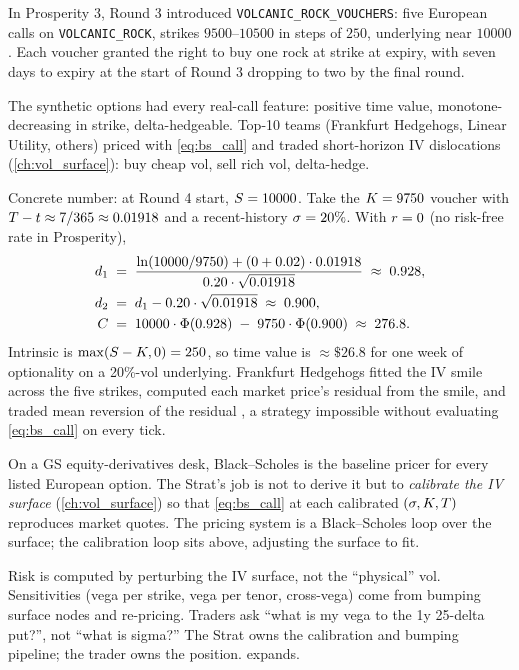 \begin{prosperitybox}
In Prosperity 3, Round 3 introduced
\texttt{VOLCANIC\_ROCK\_VOUCHERS}: five European calls on
\texttt{VOLCANIC\_ROCK}, strikes $9500$--$10500$ in steps of
$250$, underlying near $10000$ \citep{frankfurthedgehogs2025}.
Each voucher granted the right to buy one rock at strike at
expiry, with seven days to expiry at the start of Round 3
dropping to two by the final round.

The synthetic options had every real-call feature: positive time
value, monotone-decreasing in strike, delta-hedgeable. Top-10
teams (Frankfurt Hedgehogs, Linear Utility, others) priced with
\eqref{eq:bs_call} and traded short-horizon IV dislocations
(\cref{ch:vol_surface}): buy cheap vol, sell rich vol,
delta-hedge.

Concrete number: at Round 4 start, $S = 10000$. Take the
$K = 9750$ voucher with $T - t \approx 7/365 \approx
0.01918$ and a recent-history $\sigma = 20\%$. With $r = 0$
(no risk-free rate in Prosperity),
\begin{align*}
  d_1 \;&=\; \frac{\ln(10000/9750) + (0 + 0.02)\cdot 0.01918}
                  {0.20 \cdot \sqrt{0.01918}}
       \;\approx\; 0.928, \\
  d_2 \;&=\; d_1 - 0.20 \cdot \sqrt{0.01918}
       \;\approx\; 0.900, \\
  C \;&=\; 10000 \cdot \Phi(0.928)
            \;-\; 9750 \cdot \Phi(0.900)
       \;\approx\; 276.8.
\end{align*}
Intrinsic is $\max(S - K, 0) = 250$, so time value is
$\approx \$26.8$ for one week of optionality on a 20\%-vol
underlying. Frankfurt Hedgehogs fitted the IV smile across the
five strikes, computed each market price's residual from the
smile, and traded mean reversion of the residual
\citep{frankfurthedgehogs2025}, a strategy impossible without
evaluating \eqref{eq:bs_call} on every tick.
\end{prosperitybox}

\begin{gsbox}
On a GS equity-derivatives desk, Black--Scholes is the baseline
pricer for every listed European option. The Strat's job is not
to derive it but to \emph{calibrate the IV surface}
(\cref{ch:vol_surface}) so that \eqref{eq:bs_call} at each
calibrated $(\sigma, K, T)$ reproduces market quotes. The
pricing system is a Black--Scholes loop over the surface; the
calibration loop sits above, adjusting the surface to fit.

Risk is computed by perturbing the IV surface, not the
``physical'' vol. Sensitivities (vega per strike, vega per
tenor, cross-vega) come from bumping surface nodes and
re-pricing. Traders ask ``what is my vega to the 1y 25-delta
put?'', not ``what is sigma?'' The Strat owns the calibration
and bumping pipeline; the trader owns the position.
 expands.
\end{gsbox}


